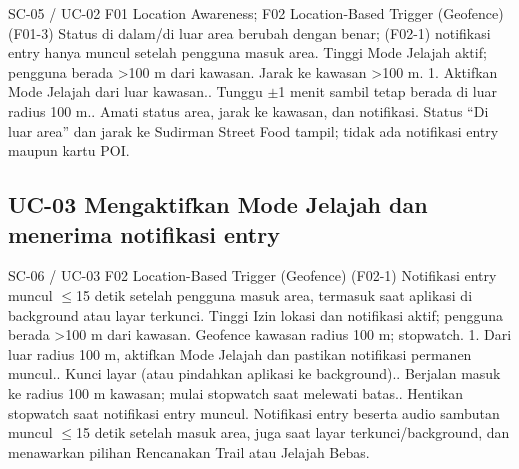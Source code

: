\renewcommand{\tcactual}{Sesuai ekspektasi pada perangkat Android (Logika luar area (\texttt{01-geofence}) lolos). Status ``Di luar area'' dan jarak ke Sudirman Street Food tampil; tidak ada notifikasi entry maupun kartu POI.}
{SC-05 / UC-02}
{F01 Location Awareness; F02 Location-Based Trigger (Geofence)}
{(F01-3) Status di dalam/di luar area berubah dengan benar; (F02-1) notifikasi entry hanya muncul setelah pengguna masuk area.}
{Tinggi}
{Mode Jelajah aktif; pengguna berada >100 m dari kawasan.}
{Jarak ke kawasan >100 m.}
{1. Aktifkan Mode Jelajah dari luar kawasan.. Tunggu \(\pm\)1 menit sambil tetap berada di luar radius 100 m.. Amati status area, jarak ke kawasan, dan notifikasi.}
{Status ``Di luar area'' dan jarak ke Sudirman Street Food tampil; tidak ada notifikasi entry maupun kartu POI.}

\subsection*{UC-03 Mengaktifkan Mode Jelajah dan menerima notifikasi entry}

\renewcommand{\tcactual}{Sesuai ekspektasi pada perangkat Android (Logika entry (\texttt{01-geofence}) lolos). Notifikasi entry beserta audio sambutan muncul \(\le\)15 detik setelah masuk area, juga saat layar terkunci/background, dan menawarkan pilihan Rencanakan Trail atau Jelajah Bebas.}
{SC-06 / UC-03}
{F02 Location-Based Trigger (Geofence)}
{(F02-1) Notifikasi entry muncul \(\le\)15 detik setelah pengguna masuk area, termasuk saat aplikasi di background atau layar terkunci.}
{Tinggi}
{Izin lokasi dan notifikasi aktif; pengguna berada >100 m dari kawasan.}
{Geofence kawasan radius 100 m; stopwatch.}
{1. Dari luar radius 100 m, aktifkan Mode Jelajah dan pastikan notifikasi permanen muncul.. Kunci layar (atau pindahkan aplikasi ke background).. Berjalan masuk ke radius 100 m kawasan; mulai stopwatch saat melewati batas.. Hentikan stopwatch saat notifikasi entry muncul.}
{Notifikasi entry beserta audio sambutan muncul \(\le\)15 detik setelah masuk area, juga saat layar terkunci/background, dan menawarkan pilihan Rencanakan Trail atau Jelajah Bebas.}

